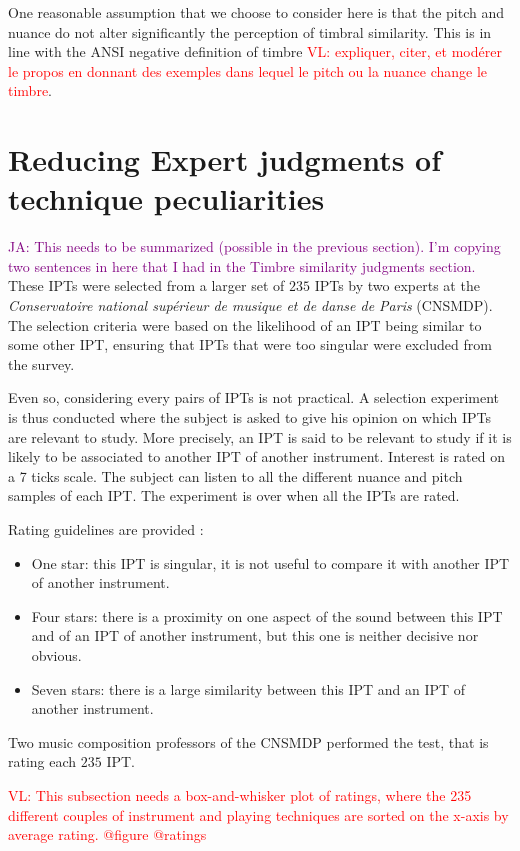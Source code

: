 \documentclass{bmcart}
\newcommand{\ipt}{IPT\xspace}
\newcommand{\ipts}{IPTs\xspace}
\newcommand{\vl}[1]{\textcolor{red}{VL: #1}}
\newcommand{\ja}[1]{\textcolor{purple}{JA: #1}}
\begin{document}
\begin{backmatter}
One reasonable assumption that we choose to consider here is that the pitch and nuance do not alter significantly the perception of timbral similarity. This is in line with the ANSI negative definition of timbre \vl{expliquer, citer, et modérer le propos en donnant des exemples dans lequel le pitch ou la nuance change le timbre}.


\section*{Reducing Expert judgments of technique peculiarities}

\ja{This needs to be summarized (possible in the previous section).
I'm copying two sentences in here that I had in the Timbre similarity judgments section.}%
These IPTs were selected from a larger set of $235$ IPTs by two experts at the \emph{Conservatoire national sup\'erieur de musique et de danse de Paris} (CNSMDP).
The selection criteria were based on the likelihood of an IPT being similar to some other IPT, ensuring that IPTs that were too singular were excluded from the survey.

Even so, considering every pairs of IPTs is not practical. A selection
experiment is thus conducted where the subject is asked to give his opinion on which
\ipts are relevant to study. More precisely, an \ipt is said to be relevant to study
if it is likely to be associated to another \ipt of another instrument.
Interest is rated on a 7 ticks scale. The subject can listen to all the different
nuance and pitch samples of each \ipt. The experiment is over when all the
\ipts are rated.

Rating guidelines are provided :
\begin{itemize}
  \item One star: this \ipt is singular, it is not useful to compare it with another \ipt of another instrument.
  \item Four stars: there is a proximity on one aspect of the sound between this
  \ipt and of an \ipt of another instrument,
  but this one is neither decisive nor obvious.
  \item Seven stars: there is a large similarity between this \ipt and an \ipt of another instrument.
\end{itemize}

Two music composition professors of the CNSMDP performed the test, that is rating each $235$ \ipt.

\vl{This subsection needs a box-and-whisker plot of ratings, where the 235 different
couples of instrument and playing techniques are sorted on the x-axis by average rating. @figure @ratings}


\end{backmatter}
\end{document}

